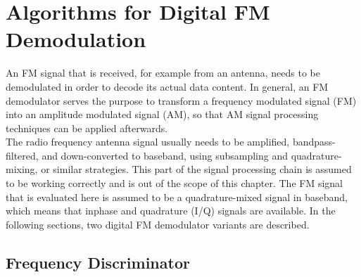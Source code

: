 \section{Algorithms for Digital FM Demodulation}
\label{sec:algorithms-for-digital-fm-demodulation}

An FM signal that is received, for example from an antenna, needs to be demodulated in order to decode its actual data content.
In general, an FM demodulator serves the purpose to transform a frequency modulated signal (FM) into an amplitude modulated signal (AM), so that AM signal processing techniques can be applied afterwards.\\

The radio frequency antenna signal usually needs to be amplified, bandpass-filtered, and down-converted to baseband, using subsampling and quadrature-mixing, or similar strategies.
This part of the signal processing chain is assumed to be working correctly and is out of the scope of this chapter. %
The FM signal that is evaluated here is assumed to be a quadrature-mixed signal in baseband, which means that inphase and quadrature (I/Q) signals are available.
%
%
In the following sections, two digital FM demodulator variants are described.



\subsection{Frequency Discriminator}

